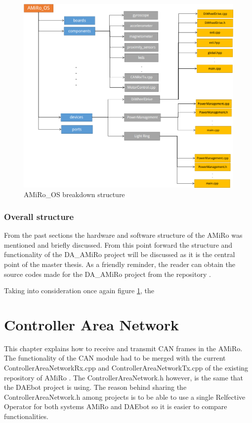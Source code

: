 \documentclass[12pt]{report}%
\begin{document}
\begin{figure}[ht]
	\centering
	\includegraphics[width=\textwidth]{AMiRo_OS}
    \caption{AMiRo\_OS breakdown structure}
    \label{fig:OS}
\end{figure}


\subsection{Overall structure}
From the past sections the hardware and software structure of the AMiRo was mentioned and briefly discussed. From this point forward the structure and functionality of the DA\_AMiRo project will be discussed as it is the central point of the master thesis. As a friendly reminder, the reader can obtain the source codes made for the DA\_AMiRo project from the repository \cite{AMiRo_Git}.

Taking into consideration once again figure \ref{fig:OS}, the 

\chapter{Controller Area Network}

This chapter explains how to receive and transmit CAN frames in the AMiRo. The functionality of the CAN module had to be merged with the current ControllerAreaNetworkRx.cpp and ControllerAreaNetworkTx.cpp of the existing repository of AMiRo \cite{AMiRo_Wiki}. The ControllerAreaNetwork.h however, is the same that the DAEbot project is using. The reason behind sharing the ControllerAreaNetwork.h among projects is to be able to use a single Relfective Operator for both systems AMiRo and DAEbot so it is easier to compare functionalities.
\end{document}
